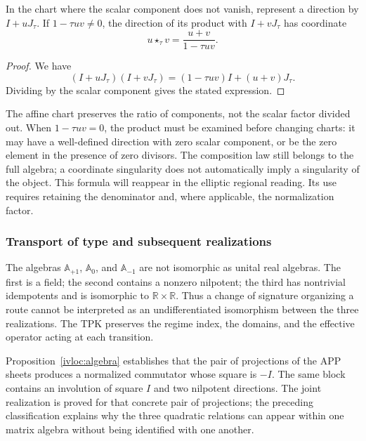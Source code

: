 \begin{proposition}
\label{trit-ampl-prop-pendientes}
In the chart where the scalar component does not vanish, represent a
direction by \(I+uJ_\tau\). If \(1-\tau uv\ne0\), the direction of its
product with \(I+vJ_\tau\) has coordinate
\[
 u\star_\tau v=\frac{u+v}{1-\tau uv}.
\]
\end{proposition}
\begin{proof}
We have
\[
 (I+uJ_\tau)(I+vJ_\tau)
   =(1-\tau uv)I+(u+v)J_\tau.
\]
Dividing by the scalar component gives the stated expression.
\end{proof}

The affine chart preserves the ratio of components, not the scalar factor
divided out. When \(1-\tau uv=0\), the product must be examined before
changing charts: it may have a well-defined direction with zero scalar
component, or be the zero element in the presence of zero divisors.
The composition law still belongs to the full algebra; a coordinate
singularity does not automatically imply a singularity of the object.
This formula will reappear in the elliptic regional reading. Its use
requires retaining the denominator and, where applicable, the normalization factor.

\subsubsection{Transport of type and subsequent realizations}
\label{trit-ampl-puentes}

The algebras \(\mathbb A_{+1}\), \(\mathbb A_0\), and
\(\mathbb A_{-1}\) are not isomorphic as unital real algebras.
The first is a field; the second contains a nonzero nilpotent; the
third has nontrivial idempotents and is isomorphic to
\(\mathbb R\times\mathbb R\). Thus a change of signature organizing a
route cannot be interpreted as an undifferentiated isomorphism between
the three realizations. The TPK preserves the regime index, the domains,
and the effective operator acting at each transition.



Proposition~\ref{ivloc:algebra} establishes that the pair of projections of the APP sheets
produces a normalized commutator whose square is \(-I\). The same block
contains an involution of square \(I\) and two nilpotent directions.
The joint realization is proved for that concrete pair of projections;
the preceding classification explains why the three quadratic relations
can appear within one matrix algebra without being identified with one another.

